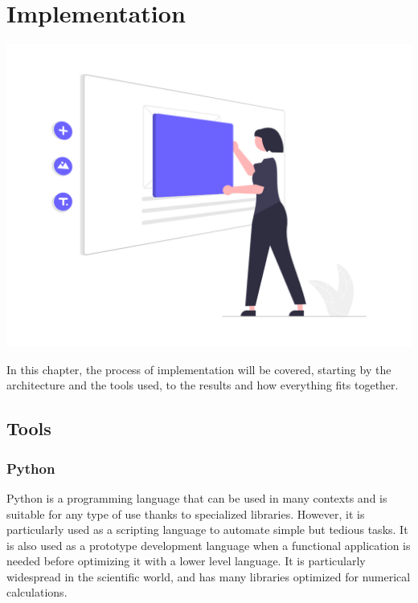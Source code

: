 
\chapter{Implementation}

		




\label{chapitre5}
		
		\includegraphics [width=1 \linewidth, height=0.8\textheight, keepaspectratio] {images/chaptersFigures/implementation.png}
		
	
		
    \newpage
    \thispagestyle{plain}
In this chapter, the process of implementation will be covered, starting by the architecture and the tools used, to the results and how everything fits together.

\section{Tools}
\label{sec:tool}
\subsection{Python}
\label{sec:python}
Python\cite{WelcomePythonOrg} is a programming language that can be used in many contexts and is suitable for any type of use thanks to specialized libraries. However, it is particularly used as a scripting language to automate simple but tedious tasks. It is also used as a prototype development language when a functional application is needed before optimizing it with a lower level language. It is particularly widespread in the scientific world, and has many libraries optimized for numerical calculations\cite{PythonLangageWikipedia}.
